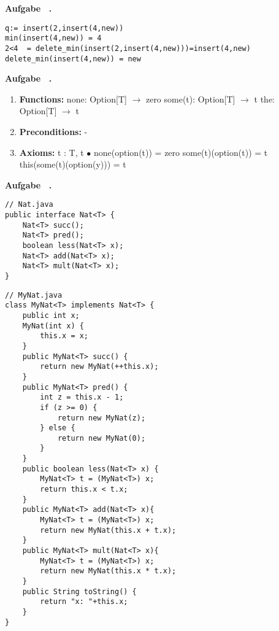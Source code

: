 \documentclass[a4paper,11pt]{article}             %
\def\vblatt{~}
\newcommand{\lstalg}{\lstset { numbers=left,language=alglang,tabsize=2,numberstyle=\tiny,style=algstyle}}
\newcounter{aufgabe}
\newcommand{\Aufgabe}{\noindent\newline\addtocounter{aufgabe}{1}\textbf{Aufgabe \vblatt.\theaufgabe}\\
}
\begin{document}
\Aufgabe
\lstalg
\begin{lstlisting}
q:= insert(2,insert(4,new))
min(insert(4,new)) = 4
2<4  = delete_min(insert(2,insert(4,new)))=insert(4,new)
delete_min(insert(4,new)) = new
\end{lstlisting}

\Aufgabe
\begin{enumerate}
\item \textbf{Functions:} 
\subitem none: Option[T] $\rightarrow$ zero
\subitem some(t): Option[T] $\rightarrow$ t
\subitem the: Option[T] $\rightarrow$ t 

\item \textbf{Preconditions:} -

\item \textbf{Axioms:} 
\subitem t : T, t $\bullet$
\subitem none(option(t)) = zero
\subitem some(t)(option(t)) = t
\subitem this(some(t)(option(y))) = t
\end{enumerate}

\Aufgabe
\begin{lstlisting}[style=javastyle]
// Nat.java 
public interface Nat<T> {
    Nat<T> succ();
    Nat<T> pred();
    boolean less(Nat<T> x);
    Nat<T> add(Nat<T> x);
    Nat<T> mult(Nat<T> x);
}
\end{lstlisting}

\newpage
\begin{lstlisting}[style=javastyle]
// MyNat.java 
class MyNat<T> implements Nat<T> {
    public int x;
    MyNat(int x) {
        this.x = x;
    }
    public MyNat<T> succ() {
        return new MyNat(++this.x);
    }
    public MyNat<T> pred() {
        int z = this.x - 1;
        if (z >= 0) {
            return new MyNat(z);
        } else {
            return new MyNat(0);
        }
    }
    public boolean less(Nat<T> x) {
        MyNat<T> t = (MyNat<T>) x;
        return this.x < t.x;
    }
    public MyNat<T> add(Nat<T> x){
        MyNat<T> t = (MyNat<T>) x;
        return new MyNat(this.x + t.x);
    }
    public MyNat<T> mult(Nat<T> x){
        MyNat<T> t = (MyNat<T>) x;
        return new MyNat(this.x * t.x);
    }
    public String toString() {
        return "x: "+this.x;
    }
}
\end{lstlisting}
\end{document}
